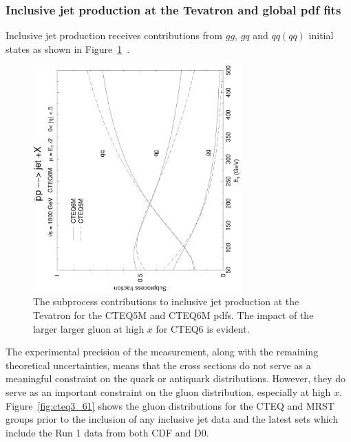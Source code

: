 \documentclass[12pt]{iopart}
\begin{document}
%
%

\subsubsection{Inclusive jet production at the Tevatron and global pdf fits}
\label{sec:jetglobal}

Inclusive jet production receives contributions from $gg$, $gq$ and $qq(q\overline{q})$  initial states as shown in Figure~\ref{fig:JO}~\cite{Stump:2003yu}.
%
\begin{figure}[t]
\begin{center}
\includegraphics[width=8cm,angle=-90]{JOd0_1_5m6m.eps}
\end{center}
\caption{
The subprocess contributions to inclusive jet production at the Tevatron for the CTEQ5M and CTEQ6M pdfs.
The impact of the larger larger gluon at high $x$ for CTEQ6 is evident.
\label{fig:JO}}
\end{figure}
%
The experimental precision of the measurement, along  with the remaining theoretical uncertainties, means that the cross sections  do
not serve  as a meaningful constraint on the quark or antiquark distributions. However, they do serve  as an important constraint on
the gluon distribution, especially at high $x$. Figure~\ref{fig:cteq3_61} shows the gluon distributions for the CTEQ and MRST groups 
prior to the inclusion of any inclusive jet data and the latest sets which include the Run 1 data from both CDF and D0.
\end{document}
